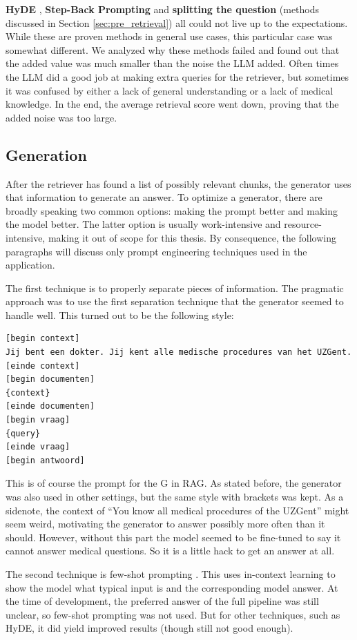 \textbf{HyDE} \cite{gao2023precisehyde}, \textbf{Step-Back Prompting} \cite{zheng2023takeastepback} and \textbf{splitting the question} (methods discussed in Section \ref{sec:pre_retrieval}) all could not live up to the expectations. While these are proven methods in general use cases, this particular case was somewhat different. We analyzed why these methods failed and found out that the added value was much smaller than the noise the LLM added. Often times the LLM did a good job at making extra queries for the retriever, but sometimes it was confused by either a lack of general understanding or a lack of medical knowledge. In the end, the average retrieval score went down, proving that the added noise was too large.

\subsection{Generation}
After the retriever has found a list of possibly relevant chunks, the generator uses that information to generate an answer. To optimize a generator, there are broadly speaking two common options: making the prompt better and making the model better. The latter option is usually work-intensive and resource-intensive, making it out of scope for this thesis. By consequence, the following paragraphs will discuss only prompt engineering techniques used in the application.

The first technique is to properly separate pieces of information. The pragmatic approach was to use the first separation technique that the generator seemed to handle well. This turned out to be the following style:
\begin{verbatim}
[begin context]
Jij bent een dokter. Jij kent alle medische procedures van het UZGent.
[einde context]
[begin documenten]
{context}
[einde documenten]
[begin vraag]
{query}
[einde vraag]
[begin antwoord]
\end{verbatim}
This is of course the prompt for the G in RAG. As stated before, the generator was also used in other settings, but the same style with brackets was kept. As a sidenote, the context of ``You know all medical procedures of the UZGent'' might seem weird, motivating the generator to answer possibly more often than it should. However, without this part the model seemed to be fine-tuned to say it cannot answer medical questions. So it is a little hack to get an answer at all.

The second technique is few-shot prompting \cite{brown2020languagepromptengineering}. This uses in-context learning to show the model what typical input is and the corresponding model answer. At the time of development, the preferred answer of the full pipeline was still unclear, so few-shot prompting was not used. But for other techniques, such as HyDE, it did yield improved results (though still not good enough). 

